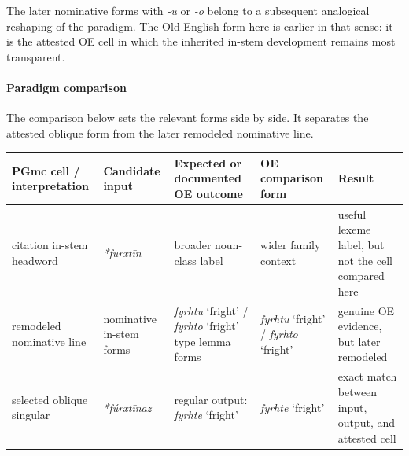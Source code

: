 \documentclass[
  british,
  a4paper,
]{article}
\newcounter{none} %
\begin{document}
The later nominative forms with \emph{-u} or \emph{-o} belong to a
subsequent analogical reshaping of the paradigm. The Old English form
here is earlier in that sense: it is the attested OE cell in which the
inherited in-stem development remains most transparent.

\paragraph{Paradigm comparison}\label{paradigm-comparison-8}

The comparison below sets the relevant forms side by side. It separates
the attested oblique form from the later remodeled nominative line.

{\def\LTcaptype{none} %
\begin{longtable}[]{@{}
  >{\raggedright\arraybackslash}p{}
  >{\raggedright\arraybackslash}p{}
  >{\raggedright\arraybackslash}p{}
  >{\raggedright\arraybackslash}p{}
  >{\raggedright\arraybackslash}p{}@{}}
\toprule\noalign{}
\begin{minipage}[b]{\linewidth}\raggedright
PGmc cell / interpretation
\end{minipage} & \begin{minipage}[b]{\linewidth}\raggedright
Candidate input
\end{minipage} & \begin{minipage}[b]{\linewidth}\raggedright
Expected or documented OE outcome
\end{minipage} & \begin{minipage}[b]{\linewidth}\raggedright
OE comparison form
\end{minipage} & \begin{minipage}[b]{\linewidth}\raggedright
Result
\end{minipage} \\
\midrule\noalign{}
\endhead
\bottomrule\noalign{}
\endlastfoot
citation in-stem headword & {\emph{*furxtīn}} & broader noun-class label
& wider family context & useful lexeme label, but not the cell compared
here \\
remodeled nominative line & nominative in-stem forms & {\emph{fyrhtu}}
`fright' / {\emph{fyrhto}} `fright' type lemma forms & {\emph{fyrhtu}}
`fright' / {\emph{fyrhto}} `fright' & genuine OE evidence, but later
remodeled \\
selected oblique singular & {\emph{*fúrxtīnaz}} & regular output:
{\emph{fyrhte}} `fright' & {\emph{fyrhte}} `fright' & exact match
between input, output, and attested cell \\
\end{longtable}
}
\end{document}

